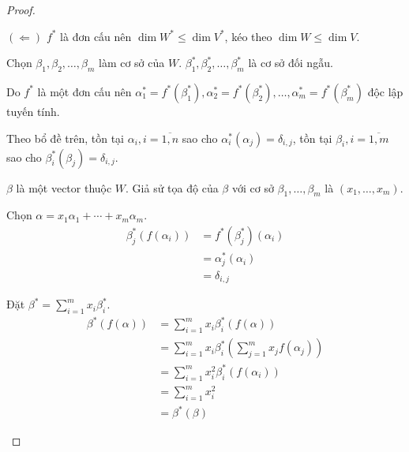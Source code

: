 \documentclass[class=nhvh-linear-algebra,crop=false]{standalone}
\begin{document}
\begin{proof}
\begin{enumerate}[label = (\arabic*)]
              \par $(\Leftarrow)$ $f^{*}$ là đơn cấu nên $\dim {W}^{*} \leq \dim {V}^{*}$, kéo theo $\dim W \leq \dim V$.
              \par Chọn $\beta_{1}, \beta_{2}, \ldots, \beta_{m}$ làm cơ sở của $W$. ${\beta}^{*}_{1}, {\beta}^{*}_{2}, \ldots, {\beta}^{*}_{m}$ là cơ sở đối ngẫu.
              \par Do $f^{*}$ là một đơn cấu nên ${\alpha}^{*}_{1} = {f}^{*}({\beta}^{*}_{1}), {\alpha}^{*}_{2} = {f}^{*}({\beta}^{*}_{2}), \ldots, {\alpha}^{*}_{m} = {f}^{*}({\beta}^{*}_{m})$ độc lập tuyến tính.
              \par Theo bổ đề trên, tồn tại $\alpha_{i}, i = \overline{1, n}$ sao cho ${\alpha}^{*}_{i}(\alpha_{j}) = \delta_{i, j}$, tồn tại $\beta_{i}, i = \overline{1, m}$ sao cho ${\beta}^{*}_{i}(\beta_{j}) = \delta_{i, j}$.
              \par $\beta$ là một vector thuộc $W$. Giả sử tọa độ của $\beta$ với cơ sở $\beta_{1}, \ldots, \beta_{m}$ là $(x_{1}, \ldots, x_{m})$.
              \par Chọn $\alpha = x_{1}\alpha_{1} + \cdots + x_{m}\alpha_{m}$.
              \begin{align*}
                  \beta^{*}_{j}(f(\alpha_{i})) & = {f^{*}}(\beta^{*}_{j})(\alpha_{i}) \\
                                               & = \alpha^{*}_{j}(\alpha_{i})         \\
                                               & = \delta_{i,j}
              \end{align*}
              \par Đặt $\beta^{*} = \sum^{m}_{i=1}x_{i}\beta^{*}_{i}$.
              \begin{align*}
                  \beta^{*}(f(\alpha)) & = \sum^{m}_{i=1}x_{i}\beta^{*}_{i}(f(\alpha))                                     \\
                                       & = \sum^{m}_{i=1}x_{i}\beta^{*}_{i}\left( \sum^{m}_{j=1}x_{j}f(\alpha_{j}) \right) \\
                                       & = \sum^{m}_{i=1}x^{2}_{i}\beta^{*}_{i}\left(f(\alpha_{i})\right)                  \\
                                       & = \sum^{m}_{i=1}x^{2}_{i}                                                         \\
                                       & = \beta^{*}(\beta)
              \end{align*}

\end{enumerate}
\end{proof}
\end{document}
